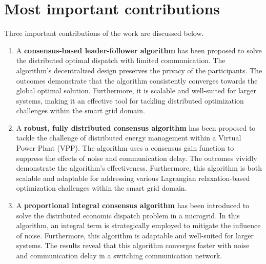 \documentclass
    [phd,synopsis]
    {iitmdissertation}
\begin{document}
\section{Most important contributions}
Three important contributions of the work are discussed below.
\begin{enumerate}
    \item A \textbf{consensus-based leader-follower algorithm} has been proposed to solve the distributed optimal dispatch with limited communication. The algorithm's decentralized design preserves the privacy of the participants. The outcomes demonstrate that the algorithm consistently converges towards the global optimal solution. Furthermore, it is scalable and well-suited for larger systems, making it an effective tool for tackling distributed optimization challenges within the smart grid domain.
    
    \item A \textbf{robust, fully distributed consensus algorithm} has been proposed to tackle the challenge of distributed energy management within a Virtual Power Plant (VPP). The algorithm uses a consensus gain function to suppress the effects of noise and communication delay. The outcomes vividly demonstrate the algorithm's effectiveness. Furthermore, this algorithm is both scalable and adaptable for addressing various Lagrangian relaxation-based optimization challenges within the smart grid domain.
    
    \item A \textbf{proportional integral consensus algorithm} has been introduced to solve the distributed economic dispatch problem in a microgrid. In this algorithm, an integral term is strategically employed to mitigate the influence of noise. Furthermore, this algorithm is adaptable and well-suited for larger systems. The results reveal that this algorithm converges faster with noise and communication delay in a switching communication network.  
\end{enumerate}
\end{document}

